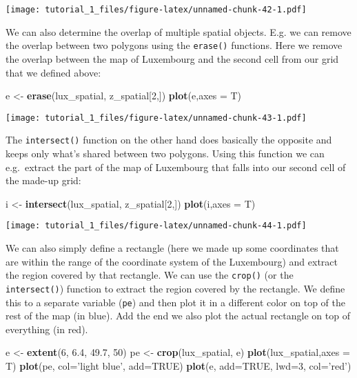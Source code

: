 \documentclass[]{article}
\newenvironment{Shaded}{\begin{snugshade}}{\end{snugshade}}
\newcommand{\DataTypeTok}[1]{\textcolor[rgb]{0.13,0.29,0.53}{#1}}
\newcommand{\DecValTok}[1]{\textcolor[rgb]{0.00,0.00,0.81}{#1}}
\newcommand{\FloatTok}[1]{\textcolor[rgb]{0.00,0.00,0.81}{#1}}
\newcommand{\KeywordTok}[1]{\textcolor[rgb]{0.13,0.29,0.53}{\textbf{#1}}}
\newcommand{\NormalTok}[1]{#1}
\newcommand{\OtherTok}[1]{\textcolor[rgb]{0.56,0.35,0.01}{#1}}
\newcommand{\StringTok}[1]{\textcolor[rgb]{0.31,0.60,0.02}{#1}}
\begin{document}
\texttt{[image: tutorial\_1\_files/figure-latex/unnamed-chunk-42-1.pdf]}

We can also determine the overlap of multiple spatial objects. E.g. we
can remove the overlap between two polygons using the \texttt{erase()}
functions. Here we remove the overlap between the map of Luxembourg and
the second cell from our grid that we defined above:

\begin{Shaded}
\begin{Highlighting}[]
\NormalTok{e <-}\StringTok{ }\KeywordTok{erase}\NormalTok{(lux_spatial, z_spatial[}\DecValTok{2}\NormalTok{,])}
\KeywordTok{plot}\NormalTok{(e,}\DataTypeTok{axes =}\NormalTok{ T)}
\end{Highlighting}
\end{Shaded}

\texttt{[image: tutorial\_1\_files/figure-latex/unnamed-chunk-43-1.pdf]}

The \texttt{intersect()} function on the other hand does basically the
opposite and keeps only what's shared between two polygons. Using this
function we can e.g.~extract the part of the map of Luxembourg that
falls into our second cell of the made-up grid:

\begin{Shaded}
\begin{Highlighting}[]
\NormalTok{i <-}\StringTok{ }\KeywordTok{intersect}\NormalTok{(lux_spatial, z_spatial[}\DecValTok{2}\NormalTok{,])}
\KeywordTok{plot}\NormalTok{(i,}\DataTypeTok{axes =}\NormalTok{ T)}
\end{Highlighting}
\end{Shaded}

\texttt{[image: tutorial\_1\_files/figure-latex/unnamed-chunk-44-1.pdf]}

We can also simply define a rectangle (here we made up some coordinates
that are within the range of the coordinate system of the Luxembourg)
and extract the region covered by that rectangle. We can use the
\texttt{crop()} (or the \texttt{intersect()}) function to extract the
region covered by the rectangle. We define this to a separate variable
(\texttt{pe}) and then plot it in a different color on top of the rest
of the map (in blue). Add the end we also plot the actual rectangle on
top of everything (in red).

\begin{Shaded}
\begin{Highlighting}[]
\NormalTok{e <-}\StringTok{ }\KeywordTok{extent}\NormalTok{(}\DecValTok{6}\NormalTok{, }\FloatTok{6.4}\NormalTok{, }\FloatTok{49.7}\NormalTok{, }\DecValTok{50}\NormalTok{)}
\NormalTok{pe <-}\StringTok{ }\KeywordTok{crop}\NormalTok{(lux_spatial, e)}
\KeywordTok{plot}\NormalTok{(lux_spatial,}\DataTypeTok{axes =}\NormalTok{ T)}
\KeywordTok{plot}\NormalTok{(pe, }\DataTypeTok{col=}\StringTok{'light blue'}\NormalTok{, }\DataTypeTok{add=}\OtherTok{TRUE}\NormalTok{)}
\KeywordTok{plot}\NormalTok{(e, }\DataTypeTok{add=}\OtherTok{TRUE}\NormalTok{, }\DataTypeTok{lwd=}\DecValTok{3}\NormalTok{, }\DataTypeTok{col=}\StringTok{'red'}\NormalTok{)}
\end{Highlighting}
\end{Shaded}
\end{document}
